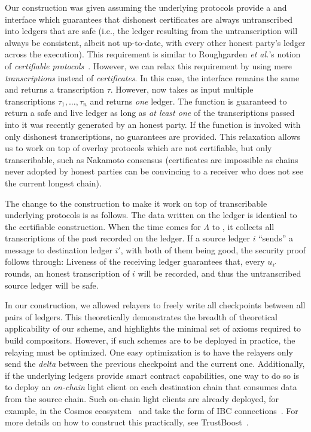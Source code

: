 \appsection[Discussion]

Our \rollerblade construction was given assuming the underlying protocols
provide a \transcribe and \untranscribe interface which guarantees that
dishonest certificates are always untranscribed into ledgers that are
safe (i.e., the ledger resulting from the untranscription will always
be consistent, albeit not up-to-date, with every other honest party's
ledger across the execution). This requirement is similar to Roughgarden
\emph{et al.}'s notion of \emph{certifiable protocols}~\cite{certifiability}.
However, we can relax this requirement by using mere \emph{transcriptions}
instead of \emph{certificates}. In this case, the \transcribe interface
remains the same and returns a transcription $\tau$. However, \untranscribe
now takes as input multiple transcriptions $\tau_1, \ldots, \tau_n$ and
returns \emph{one} ledger. The \untranscribe function is guaranteed to return
a safe and live ledger as long as \emph{at least one} of the transcriptions
passed into it was recently generated by an honest party. If the \untranscribe
function is invoked with only dishonest transcriptions, no guarantees are
provided. This relaxation allows us to work on top of overlay protocols
which are not certifiable, but only transcribable, such as Nakamoto consensus
(certificates are impossible as chains never adopted by honest parties
can be convincing to a receiver who does not see the current longest chain).

The change to the \rollerblade construction to make it work on top of transcribable
underlying protocols is as follows. The data written on the ledger is identical to the
certifiable \rollerblade construction. When the time comes for $\Lambda$ to
\untranscribe, it collects all transcriptions of the past recorded on the ledger.
If a source ledger $i$ ``sends'' a message to destination ledger $i'$, with both
of them being good, the security proof follows through:
Liveness of the receiving ledger guarantees that, every $u_{i'}$ rounds, an honest
transcription of $i$ will be recorded, and thus the untranscribed source ledger
will be safe.

In our \rollerblade construction, we allowed relayers to freely write all
checkpoints between all pairs of ledgers. This theoretically demonstrates
the breadth of theoretical applicability of our scheme, and highlights
the minimal set of axioms required to build compositors.
However, if such schemes are to be deployed in practice, the relaying
must be optimized. One easy optimization is to have the relayers only
send the \emph{delta} between the previous checkpoint and the current one.
Additionally, if the underlying ledgers provide smart contract
capabilities, one way to do so is to deploy an \emph{on-chain} light
client on each destination chain that consumes data from the source
chain. Such on-chain light clients are already deployed, for example,
in the Cosmos ecosystem~\cite{cosmos} and take the form of IBC
connections~\cite{ibc}. For more details on how to construct this
practically, see TrustBoost~\cite{trustboost}.
